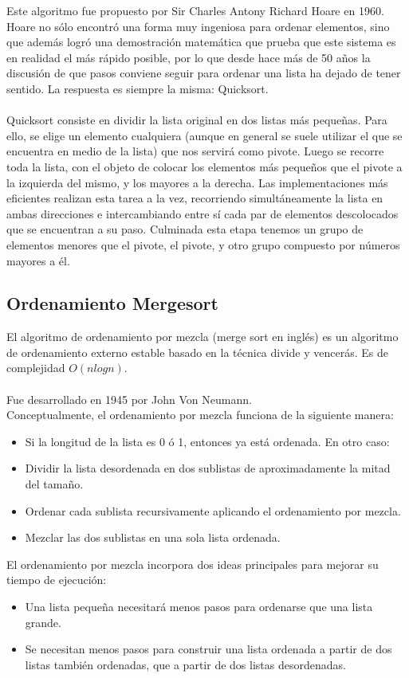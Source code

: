 \documentclass{article}
\begin{document}
Este algoritmo fue propuesto por Sir Charles Antony Richard Hoare en 1960. Hoare no s\'olo
encontr\'o una forma muy ingeniosa para ordenar elementos, sino que adem\'as logr\'o una
demostraci\'on matem\'atica que prueba que este sistema es en realidad el m\'as rápido
posible, por lo que desde hace m\'as de 50 a\~{n}os la discusi\'on de que pasos conviene
seguir para ordenar una lista ha dejado de tener sentido. La respuesta es siempre la
misma: Quicksort.\\
\\
Quicksort consiste en dividir la lista original en dos listas más peque\~nas. Para ello,
se elige un elemento cualquiera (aunque en general se suele utilizar el que se encuentra
en medio de la lista) que nos servir\'a como pivote. Luego se recorre toda la lista, con
el objeto de colocar los elementos más peque\~{n}os que el pivote a la izquierda del
mismo, y los mayores a la derecha. Las implementaciones m\'as eficientes realizan esta
tarea a la vez, recorriendo simultáneamente la lista en ambas direcciones e intercambiando
entre s\'i cada par de elementos descolocados que se encuentran a su paso. Culminada
esta etapa tenemos un grupo de elementos menores que el pivote, el pivote, y otro grupo
compuesto por números mayores a \'el.

\subsection*{Ordenamiento Mergesort}
El algoritmo de ordenamiento por mezcla (merge sort en ingl\'es) es un algoritmo de
ordenamiento externo estable basado en la t\'ecnica divide y vencer\'as. Es de complejidad $O(n log n)$. \\
\\
Fue desarrollado en 1945 por John Von Neumann.\\
Conceptualmente, el ordenamiento por mezcla funciona de la siguiente manera:\\
\begin{itemize}

\item Si la longitud de la lista es 0 \'o 1, entonces ya est\'a ordenada. En otro caso:
\item Dividir la lista desordenada en dos sublistas de aproximadamente la mitad del
tama\~{n}o.
\item Ordenar cada sublista recursivamente aplicando el ordenamiento por mezcla.
\item Mezclar las dos sublistas en una sola lista ordenada.

\end{itemize}

El ordenamiento por mezcla incorpora dos ideas principales para mejorar su tiempo de
ejecuci\'on:
\begin{itemize}
\item Una lista peque\~na necesitar\'a menos pasos para ordenarse que una lista grande.

\item Se necesitan menos pasos para construir una lista ordenada a partir de dos listas tambi\'en ordenadas, que a partir de dos listas desordenadas.
\end{itemize}
\end{document}
